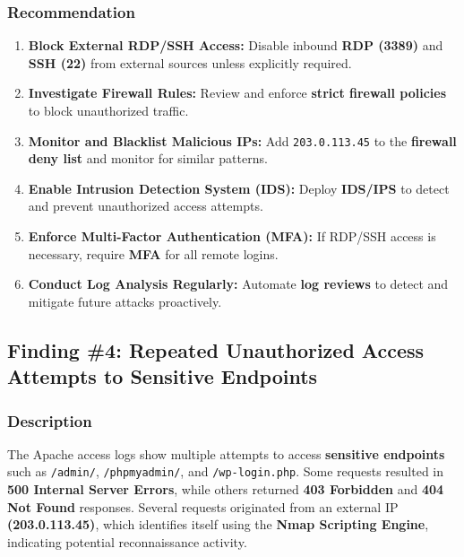 \documentclass[11pt]{article}
\begin{document}
\subsubsection{Recommendation}
\begin{enumerate}
    \item \textbf{Block External RDP/SSH Access:} Disable inbound \textbf{RDP (3389)} and \textbf{SSH (22)} from external sources unless explicitly required.
    \item \textbf{Investigate Firewall Rules:} Review and enforce \textbf{strict firewall policies} to block unauthorized traffic.
    \item \textbf{Monitor and Blacklist Malicious IPs:} Add \texttt{203.0.113.45} to the \textbf{firewall deny list} and monitor for similar patterns.
    \item \textbf{Enable Intrusion Detection System (IDS):} Deploy \textbf{IDS/IPS} to detect and prevent unauthorized access attempts.
    \item \textbf{Enforce Multi-Factor Authentication (MFA):} If RDP/SSH access is necessary, require \textbf{MFA} for all remote logins.
    \item \textbf{Conduct Log Analysis Regularly:} Automate \textbf{log reviews} to detect and mitigate future attacks proactively.
\end{enumerate}

\subsection{Finding \#4: Repeated Unauthorized Access Attempts to Sensitive Endpoints}

\subsubsection{Description}
The Apache access logs show multiple attempts to access \textbf{sensitive endpoints} such as \texttt{/admin/}, \texttt{/phpmyadmin/}, and \texttt{/wp-login.php}. Some requests resulted in \textbf{500 Internal Server Errors}, while others returned \textbf{403 Forbidden} and \textbf{404 Not Found} responses.  
Several requests originated from an external IP \textbf{(203.0.113.45)}, which identifies itself using the \textbf{Nmap Scripting Engine}, indicating potential reconnaissance activity.
\end{document}
